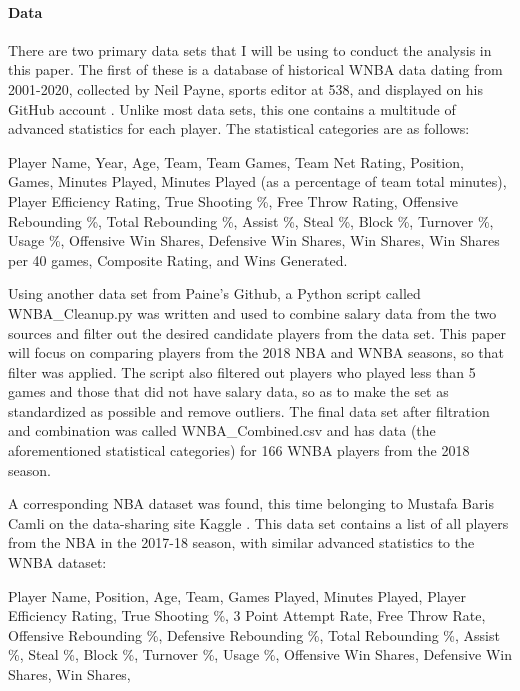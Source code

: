 \documentclass[12pt]{article}
\begin{document}
\paragraph{Data}
There are two primary data sets that I will be using to conduct the analysis in this paper. The first of these is a 
database of historical WNBA data dating from 2001-2020, collected by Neil Payne, sports editor at 538, and displayed 
on his GitHub account \cite{first}. Unlike most data sets, this one contains a multitude of advanced statistics for 
each player. The statistical categories are as follows:
\newline
\par
Player Name, Year, Age, Team, Team Games, Team Net Rating, Position, Games, Minutes Played, Minutes Played (as a percentage 
of team total minutes), Player Efficiency Rating, True Shooting \%, Free Throw Rating, Offensive Rebounding \%, Total 
Rebounding \%, Assist \%, Steal \%, Block \%, Turnover \%, Usage \%, Offensive Win Shares, Defensive Win Shares, 
Win Shares, Win Shares per 40 games, Composite Rating, and Wins Generated.
\newline
\par
Using another data set from Paine’s Github, a Python script called WNBA\_Cleanup.py was written and used to combine 
salary data from the two sources and filter out the desired candidate players from the data set. This paper will 
focus on comparing players from the 2018 NBA and WNBA seasons, so that filter was applied. The script also 
filtered out players who played less than 5 games and those that did not have salary data, so as to make the set as 
standardized as possible and remove outliers. The final data set after filtration and combination was called 
WNBA\_Combined.csv and has data (the aforementioned statistical categories) for 166 WNBA players from the 2018 season.
\par
A corresponding NBA dataset was found, this time belonging to Mustafa Baris Camli on the data-sharing site 
Kaggle \cite{nba}. This data set contains a list of all players from the NBA in the 2017-18 season, with similar 
advanced statistics to the WNBA dataset:
\newline
\par
Player Name, Position, Age, Team, Games Played, Minutes Played, Player Efficiency Rating, True Shooting \%, 
3 Point Attempt Rate, Free Throw Rate, Offensive Rebounding \%, Defensive Rebounding \%, Total Rebounding \%, 
Assist \%, Steal \%, Block \%, Turnover \%, Usage \%, Offensive Win Shares, Defensive Win Shares, Win Shares, 
\end{document}
